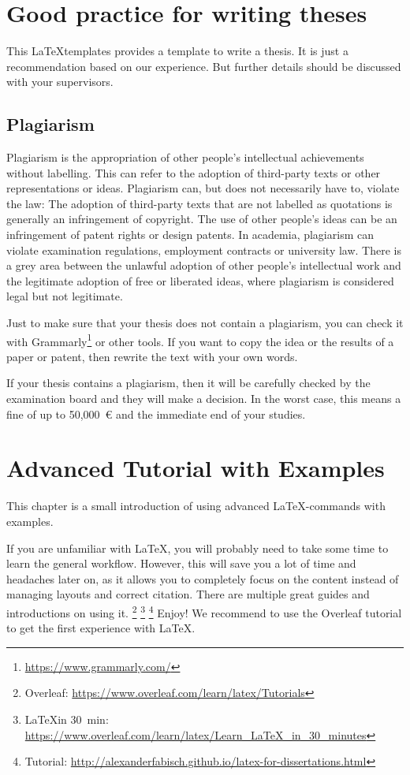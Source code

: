 \chapter{Good practice for writing theses}
This \LaTeX templates provides a template to write a thesis. It is just a recommendation based on our experience. But further details should be discussed with your supervisors.
\section*{Plagiarism}
Plagiarism is the appropriation of other people's intellectual achievements without labelling. This can refer to the adoption of third-party texts or other representations or ideas. Plagiarism can, but does not necessarily have to, violate the law: The adoption of third-party texts that are not labelled as quotations is generally an infringement of copyright. The use of other people's ideas can be an infringement of patent rights or design patents. In academia, plagiarism can violate examination regulations, employment contracts or university law. There is a grey area between the unlawful adoption of other people's intellectual work and the legitimate adoption of free or liberated ideas, where plagiarism is considered legal but not legitimate.

Just to make sure that your thesis does not contain a plagiarism, you can check it with Grammarly\footnote{\url{https://www.grammarly.com/}} or other tools. If you want to copy the idea or the results of a paper or patent, then rewrite the text with your own words.

If your thesis contains a plagiarism, then it will be carefully checked by the examination board and they will make a decision. In the worst case, this means a fine of up to 50,000~€ and the immediate end of your studies.
\chapter{Advanced Tutorial with Examples}
This chapter is a small introduction of using advanced \LaTeX-commands with examples. 

If you are unfamiliar with {\LaTeX}, you will probably need to take some time to learn the general workflow. However, this will save you a lot of time and headaches later on,
as it allows you to completely focus on the content instead of managing layouts and correct citation. There are multiple great guides and introductions on using it.
\footnote{Overleaf: \url{https://www.overleaf.com/learn/latex/Tutorials}}
\footnote{\LaTeX in 30~min: \url{https://www.overleaf.com/learn/latex/Learn_LaTeX_in_30_minutes}}
\footnote{Tutorial: \url{http://alexanderfabisch.github.io/latex-for-dissertations.html}} 
Enjoy! We recommend to use the Overleaf tutorial to get the first experience with \LaTeX.
